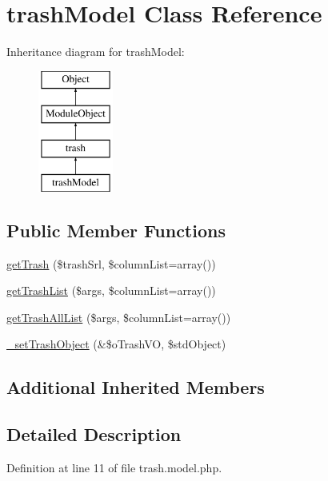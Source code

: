 \hypertarget{classtrashModel}{}\section{trash\+Model Class Reference}
\label{classtrashModel}
Inheritance diagram for trash\+Model\+:\begin{figure}[H]
\begin{center}
\leavevmode
\includegraphics[height=4.000000cm]{classtrashModel}
\end{center}
\end{figure}
\subsection*{Public Member Functions}
\begin{DoxyCompactItemize}
\item 
\hyperlink{classtrashModel_ac0f5e5599f150c464bc0d96063ed632f}{get\+Trash} (\$trash\+Srl, \$column\+List=array())
\item 
\hyperlink{classtrashModel_a0b375cfc47cac28e3b7d7fd8555483fc}{get\+Trash\+List} (\$args, \$column\+List=array())
\item 
\hyperlink{classtrashModel_aad709b5f33dfed12c179dd1582b3e507}{get\+Trash\+All\+List} (\$args, \$column\+List=array())
\item 
\hyperlink{classtrashModel_af410c03d8545197837e381ecce862a7c}{\+\_\+set\+Trash\+Object} (\&\$o\+Trash\+VO, \$std\+Object)
\end{DoxyCompactItemize}
\subsection*{Additional Inherited Members}


\subsection{Detailed Description}


Definition at line 11 of file trash.\+model.\+php.



